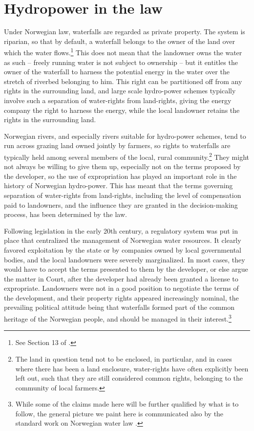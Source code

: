 \section{Hydropower in the law}\label{sec:hl}

Under Norwegian law, waterfalls are regarded as private property. The system is riparian, so that by default, a waterfall belongs to the owner of the land over which the water flows.\footnote{See Section 13 of \cite{wra00}.} This does not mean that the landowner owns the water as such -- freely running water is not subject to ownership -- but it entitles the owner of the waterfall to harness the potential energy in the water over the stretch of riverbed belonging to him. This right can be partitioned off from any rights in the surrounding land, and large scale hydro-power schemes typically involve such a separation of water-rights from land-rights, giving the energy company the right to harness the energy, while the local landowner retains the rights in the surrounding land.

Norwegian rivers, and especially rivers suitable for hydro-power schemes, tend to run across grazing land owned jointly by farmers, so rights to waterfalls are typically held among several members of the local, rural community.\footnote{The land in question tend not to be enclosed, in particular, and in cases where there has been a land enclosure, water-rights have often explicitly been left out, such that they are still considered common rights, belonging to the community of local farmers.} They might not always be willing to give them up, especially not on the terms proposed by the developer, so the use of expropriation has played an important role in the history of Norwegian hydro-power. This has meant that the terms governing separation of water-rights from land-rights, including the level of compensation paid to landowners, and the influence they are granted in the decision-making process, has been determined by the law. 

Following legislation in the early 20th century, a regulatory system was put in place that centralized the management of Norwegian water resources. It clearly favored exploitation by the state or by companies owned by local governmental bodies, and the local landowners were severely marginalized. In most cases, they would have to accept the terms presented to them by the developer, or else argue the matter in Court, after the developer had already been granted a license to expropriate. 
Landowners were not in a good position to negotiate the terms of the development, and their property rights appeared increasingly nominal, the prevailing political attitude being that waterfalls formed part of the common heritage of the Norwegian people, and should be managed in their interest.\footnote{While some of the claims made here will be further qualified by what is to follow, the general picture we paint here is communicated also by the standard work on Norwegian water law \cite{falk}.}

